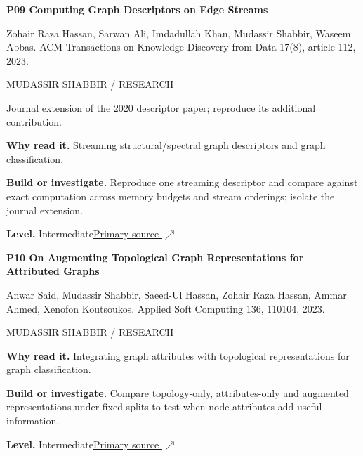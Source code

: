 \documentclass[11pt,letterpaper]{article}
\begin{document}
\begin{minipage}{\linewidth}
{\large\bfseries P09 Computing Graph Descriptors on Edge Streams}\par
Zohair Raza Hassan, Sarwan Ali, Imdadullah Khan, Mudassir Shabbir, Waseem Abbas. ACM Transactions on Knowledge Discovery from Data 17(8), article 112, 2023.\par
\textcolor{ink}{\small MUDASSIR SHABBIR / RESEARCH}\par
{\small Journal extension of the 2020 descriptor paper; reproduce its additional contribution.}\par
\textbf{Why read it.} Streaming structural/spectral graph descriptors and graph classification.\par
\textbf{Build or investigate.} Reproduce one streaming descriptor and compare against exact computation across memory budgets and stream orderings; isolate the journal extension.\par
\textbf{Level.} Intermediate\quad\href{https://doi.org/10.1145/3591468}{Primary source $\nearrow$}\par
\end{minipage}\par\vspace{10pt}
\begin{minipage}{\linewidth}
{\large\bfseries P10 On Augmenting Topological Graph Representations for Attributed Graphs}\par
Anwar Said, Mudassir Shabbir, Saeed-Ul Hassan, Zohair Raza Hassan, Ammar Ahmed, Xenofon Koutsoukos. Applied Soft Computing 136, 110104, 2023.\par
\textcolor{ink}{\small MUDASSIR SHABBIR / RESEARCH}\par
\textbf{Why read it.} Integrating graph attributes with topological representations for graph classification.\par
\textbf{Build or investigate.} Compare topology-only, attributes-only and augmented representations under fixed splits to test when node attributes add useful information.\par
\textbf{Level.} Intermediate\quad\href{https://doi.org/10.1016/j.asoc.2023.110104}{Primary source $\nearrow$}\par
\end{minipage}\par\vspace{10pt}
\end{document}
